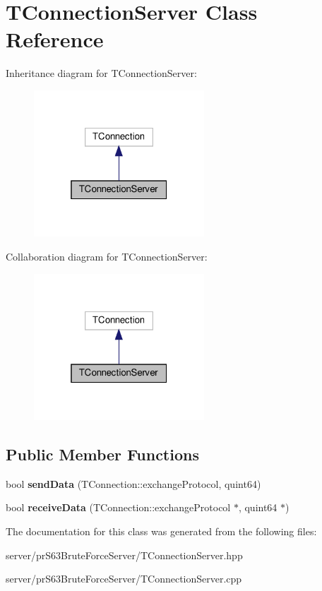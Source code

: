 \hypertarget{class_t_connection_server}{}\section{T\+Connection\+Server Class Reference}
\label{class_t_connection_server}


Inheritance diagram for T\+Connection\+Server\+:
\nopagebreak
\begin{figure}[H]
\begin{center}
\leavevmode
\includegraphics[width=181pt]{class_t_connection_server__inherit__graph}
\end{center}
\end{figure}


Collaboration diagram for T\+Connection\+Server\+:
\nopagebreak
\begin{figure}[H]
\begin{center}
\leavevmode
\includegraphics[width=181pt]{class_t_connection_server__coll__graph}
\end{center}
\end{figure}
\subsection*{Public Member Functions}
\begin{DoxyCompactItemize}
\item 
\mbox{\label{class_t_connection_server_a2c11efa0d1ef5d0f86b9087cf1748132}} 
bool {\bfseries send\+Data} (T\+Connection\+::exchange\+Protocol, quint64)
\item 
\mbox{\label{class_t_connection_server_aef53054f30b69c41aa6693dee96924a9}} 
bool {\bfseries receive\+Data} (T\+Connection\+::exchange\+Protocol $\ast$, quint64 $\ast$)
\end{DoxyCompactItemize}


The documentation for this class was generated from the following files\+:\begin{DoxyCompactItemize}
\item 
server/pr\+S63\+Brute\+Force\+Server/T\+Connection\+Server.\+hpp\item 
server/pr\+S63\+Brute\+Force\+Server/T\+Connection\+Server.\+cpp\end{DoxyCompactItemize}

